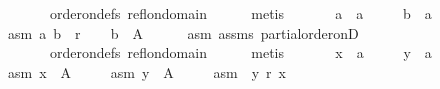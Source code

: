 \begin{isabellebody}
\ \ \ \ \ \ \ \ \ \ order{\isacharunderscore}{\kern0pt}on{\isacharunderscore}{\kern0pt}defs{\isacharparenleft}{\kern0pt}{}{\isacharparenright}{\kern0pt}\ refl{\isacharunderscore}{\kern0pt}on{\isacharunderscore}{\kern0pt}domain\isanewline
\ \ \ \ \isamarkupfalse%
\ metis\isanewline
{}\isamarkupfalse%
\isanewline
\ \ \isamarkupfalse%
\isanewline
\ \ \ \ a\ {\isacharcolon}{\kern0pt}{\isacharcolon}{\kern0pt}\ {\isachardoublequoteopen}{\isacharprime}{\kern0pt}a{\isachardoublequoteclose}\ \isanewline
\ \ \ \ b\ {\isacharcolon}{\kern0pt}{\isacharcolon}{\kern0pt}\ {\isachardoublequoteopen}{\isacharprime}{\kern0pt}a{\isachardoublequoteclose}\isanewline
\ \ \isamarkupfalse%
\isanewline
\ \ \ \ asm{}{\isacharcolon}{\kern0pt}\ {\isachardoublequoteopen}{\isacharparenleft}{\kern0pt}a{\isacharcomma}{\kern0pt}\ b{\isacharparenright}{\kern0pt}\ {\isasymin}\ r{\isachardoublequoteclose}\isanewline
\ \ \isamarkupfalse%
\ {\isachardoublequoteopen}b\ {\isasymin}\ A{\isachardoublequoteclose}\isanewline
\ \ \ \ \isamarkupfalse%
\ asm{}\ assms\ partial{\isacharunderscore}{\kern0pt}order{\isacharunderscore}{\kern0pt}onD{\isacharparenleft}{\kern0pt}{}{\isacharparenright}{\kern0pt}\isanewline
\ \ \ \ \ \ \ \ \ \ order{\isacharunderscore}{\kern0pt}on{\isacharunderscore}{\kern0pt}defs{\isacharparenleft}{\kern0pt}{}{\isacharparenright}{\kern0pt}\ refl{\isacharunderscore}{\kern0pt}on{\isacharunderscore}{\kern0pt}domain\isanewline
\ \ \ \ \isamarkupfalse%
\ metis\isanewline
{}\isamarkupfalse%
\isanewline
\ \ \isamarkupfalse%
\isanewline
\ \ \ \ x\ {\isacharcolon}{\kern0pt}{\isacharcolon}{\kern0pt}\ {\isachardoublequoteopen}{\isacharprime}{\kern0pt}a{\isachardoublequoteclose}\ \isanewline
\ \ \ \ y\ {\isacharcolon}{\kern0pt}{\isacharcolon}{\kern0pt}\ {\isachardoublequoteopen}{\isacharprime}{\kern0pt}a{\isachardoublequoteclose}\isanewline
\ \ \isamarkupfalse%
\isanewline
\ \ \ \ asm{}{\isacharcolon}{\kern0pt}\ {\isachardoublequoteopen}x\ {\isasymin}\ A{\isachardoublequoteclose}\ \isanewline
\ \ \ \ asm{}{\isacharcolon}{\kern0pt}\ {\isachardoublequoteopen}y\ {\isasymin}\ A{\isachardoublequoteclose}\ \isanewline
\ \ \ \ asm{}{\isacharcolon}{\kern0pt}\ {\isachardoublequoteopen}{\isasymnot}\ y\ {\isasympreceq}\isactrlsub r\ x{\isachardoublequoteclose}\isanewline
\ \ \isamarkupfalse%

\end{isabellebody}
